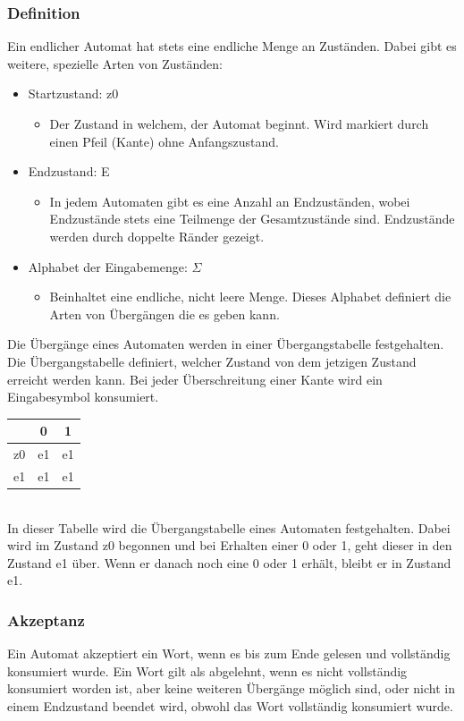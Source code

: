 \documentclass{article}
\begin{document}
	\subsubsection{Definition}
	Ein endlicher Automat hat stets eine endliche Menge an Zuständen. Dabei gibt es weitere, spezielle Arten von Zuständen:
	\begin{itemize}
		\item{Startzustand: z0}
		\begin{itemize}
			\item{Der Zustand in welchem, der Automat beginnt. Wird markiert durch einen Pfeil (Kante) ohne Anfangszustand.}
		\end{itemize}
		\item{Endzustand: E}
		\begin{itemize}
			\item{In jedem Automaten gibt es eine Anzahl an Endzuständen, wobei Endzustände stets eine Teilmenge der Gesamtzustände sind. Endzustände werden durch doppelte Ränder gezeigt.}
		\end{itemize}
		\item{Alphabet der Eingabemenge: $\Sigma$}
		\begin{itemize}
			\item{Beinhaltet eine endliche, nicht leere Menge. Dieses Alphabet definiert die Arten von Übergängen die es geben kann.}
		\end{itemize}
	\end{itemize}
	Die Übergänge eines Automaten werden in einer Übergangstabelle festgehalten. Die Übergangstabelle definiert, welcher Zustand von dem jetzigen Zustand erreicht werden kann. Bei jeder Überschreitung einer Kante wird ein Eingabesymbol konsumiert. \\
	\begin{tabular}{| c | c | c |}
		\toprule
		& \textbf{0} & \textbf{1}  \\ \midrule
		z0 & e1 & e1 \\ \hline
		e1 & e1 & e1 \\
		\bottomrule
	\end{tabular} \\
	In dieser Tabelle wird die Übergangstabelle eines Automaten festgehalten. Dabei wird im Zustand z0 begonnen und bei Erhalten einer 0 oder 1, geht dieser in den Zustand e1 über. Wenn er danach noch eine 0 oder 1 erhält, bleibt er in Zustand e1. \\
	\subsubsection{Akzeptanz}
	Ein Automat akzeptiert ein Wort, wenn es bis zum Ende gelesen und vollständig konsumiert wurde. Ein Wort gilt als abgelehnt, wenn es nicht vollständig konsumiert worden ist, aber keine weiteren Übergänge möglich sind, oder nicht in einem Endzustand beendet wird, obwohl das Wort vollständig konsumiert wurde.
\end{document}
